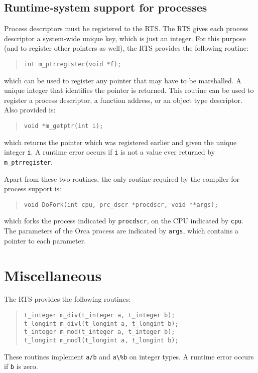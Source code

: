 \documentclass[10pt]{article}
\begin{document}
\subsection{Runtime-system support for processes}\label{sec:rtsproc}
Process descriptors must be registered to the RTS.
The RTS gives each process descriptor a system-wide unique key, which is
just an integer.
For this purpose (and to register other pointers as well), the RTS
provides the following routine:
\begin{quote}
\begin{verbatim}
int m_ptrregister(void *f);
\end{verbatim}
\end{quote}
which can be used to register any pointer that may have to be marshalled.
A unique integer that identifies the pointer is returned.
This routine can be used to register a process descriptor, a function
address, or an object type descriptor.
Also provided is:
\begin{quote}
\begin{verbatim}
void *m_getptr(int i);
\end{verbatim}
\end{quote}
which returns the pointer which was registered earlier and given the
unique integer \verb+i+.
A runtime error occurs if \verb+i+
is not a value ever returned by
\verb+m_ptrregister+.

Apart from these two routines, the only routine required by the
compiler for process support is:
\begin{quote}
\begin{verbatim}
void DoFork(int cpu, prc_dscr *procdscr, void **args);
\end{verbatim}
\end{quote}
which forks the process indicated by \verb+procdscr+, on the
CPU indicated by \verb+cpu+.
The parameters of the Orca process are indicated by \verb+args+,
which contains a pointer to each parameter.

\section{Miscellaneous}\label{sec:misc}
The RTS provides the following routines:
\begin{quote}
\begin{verbatim}
t_integer m_div(t_integer a, t_integer b);
t_longint m_divl(t_longint a, t_longint b);
t_integer m_mod(t_integer a, t_integer b);
t_longint m_modl(t_longint a, t_longint b);
\end{verbatim}
\end{quote}
These routines implement \verb+a/b+ and \verb+a\%b+ on integer types.
A runtime error occurs if \verb+b+ is zero.
\end{document}
